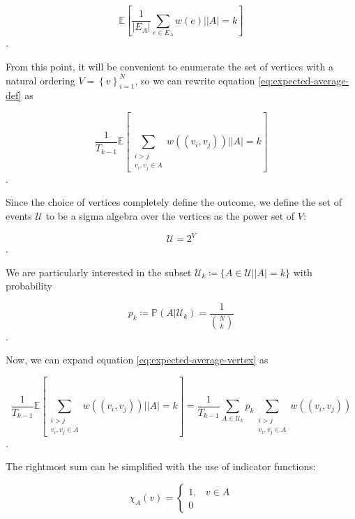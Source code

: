 \documentclass[a4paper, 10pt]{article}
\begin{document}
\begin{equation}
    \mathbb{E}\left[\frac{1}{|E_A|}\sum_{e \in E_A} w(e) \Big\vert |A| = k\right]
    \label{eq:expected-average-def}
\end{equation}
.

From this point, it will be convenient to enumerate the set of vertices with a natural ordering $V = \left\{v\right\}_{i=1}^N$, so we can rewrite equation \ref{eq:expected-average-def} as

\begin{equation}
    \frac{1}{T_{k-1}}\mathbb{E}\left[\sum_{\substack{i>j \\ v_i,v_j \in A}}w((v_i,v_j)) \Big\vert |A| = k\right]
    \label{eq:expected-average-vertex}
\end{equation}
.

Since the choice of vertices completely define the outcome, we define the set of events $\mathcal{U}$ to be a sigma algebra over the vertices as the power set of $V$:

\begin{equation}
    \mathcal{U} = 2^{V}
    \label{eq:power-set-is-sigma-algebra}   
\end{equation}
.

We are particularly interested in the subset $\mathcal{U}_k \coloneq \{A \in \mathcal{U} | |A|=k\}$ with probability

\begin{equation}
    p_k \coloneq \mathbb{P}(A|\mathcal{U}_k) = \frac{1}{\binom{N}{k}}
    \label{eq:conditional-probability-fixed-k}
\end{equation}
.

Now, we can expand equation \ref{eq:expected-average-vertex} as

\begin{equation}
    \frac{1}{T_{k-1}}\mathbb{E}\left[\sum_{\substack{i>j \\ v_i,v_j \in A}}w((v_i,v_j)) \Big\vert |A| = k\right] = \frac{1}{T_{k-1}}\sum_{A \in \mathcal{U}_k} p_k \sum_{\substack{i>j \\ v_i,v_j \in A}}w((v_i,v_j))
    \label{eq:expectation-as-sum}
\end{equation}
.

The rightmost sum can be simplified with the use of indicator functions:

\begin{equation}
    \chi_{A}(v) = \begin{cases}
        1, & v \in A \\
        0
    \end{cases}
    \label{eq:indicator-function}
\end{equation}
\end{document}
